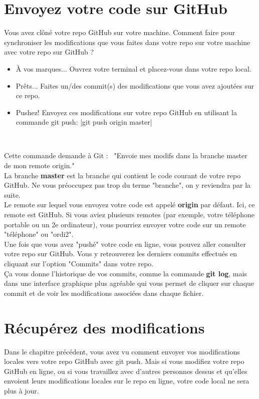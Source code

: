 \section{Envoyez votre code sur GitHub}
Vous avez clôné votre repo GitHub sur votre machine. Comment faire pour synchroniser les modifications que vous faites dans votre repo sur votre machine avec votre repo sur GitHub ?
\begin{itemize}
\item À vos marques... Ouvrez votre terminal et placez-vous dans votre repo local.
\item Prêts... Faites un/des commit(s) des modifications que vous avez ajoutées sur ce repo.
\item Pushez! Envoyez ces modifications sur votre repo GitHub en utilisant la commande git push: |git push origin master|
\end{itemize}

\ 

Cette commande demande à Git : \
"Envoie mes modifs dans la branche master de mon remote origin."\\

La branche \textbf{master}  est la branche qui contient le code courant de votre repo GitHub. Ne vous préoccupez pas trop du terme "branche", on y reviendra par la suite.\\

 Le remote sur lequel vous envoyez votre code est appelé \textbf{origin} par défaut. Ici, ce remote est GitHub. Si vous aviez plusieurs remotes (par exemple, votre téléphone portable ou un 2e ordinateur), vous pourriez envoyer votre code sur un remote "téléphone" ou "ordi2".\\
 
Une fois que vous avez "pushé" votre code en ligne, vous pouvez aller consulter votre repo sur GitHub. Vous y retrouverez les derniers commits effectués en cliquant sur l'option "Commits" dans votre repo. \\

Ça vous donne l'historique de vos commits, comme la commande \textbf{git log}, mais dans une interface graphique plus agréable qui vous permet de cliquer sur chaque commit et de voir les modifications associées dans chaque fichier. 

\section{Récupérez des modifications}
Dans le chapitre précédent, vous avez vu comment envoyer vos modifications locales vers votre repo GitHub avec git push. Mais si vous modifiez votre repo GitHub en ligne, ou si vous travaillez avec d'autres personnes dessus et qu'elles envoient leurs modifications locales sur le repo en ligne, votre code local ne sera plus à jour.\\

